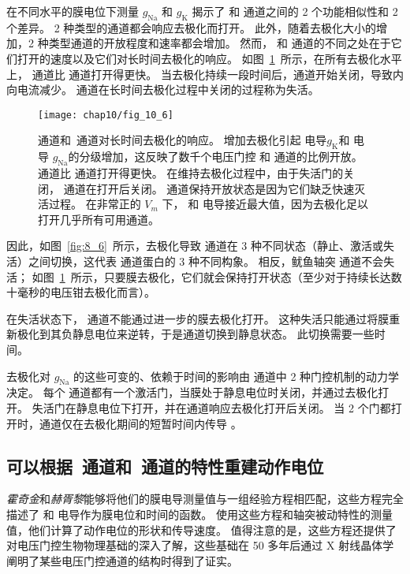 在不同水平的膜电位下测量 $g_\text{Na}$ 和 $g_\text{K}$ 揭示了  和  通道之间的 2 个功能相似性和 2 个差异。
2 种类型的通道都会响应去极化而打开。
此外，随着去极化大小的增加，2 种类型通道的开放程度和速率都会增加。
然而， 和  通道的不同之处在于它们打开的速度以及它们对长时间去极化的响应。
如图~\ref{fig:10_6}~所示，在所有去极化水平上， 通道比  通道打开得更快。 
当去极化持续一段时间后，通道开始关闭，导致内向电流减少。
 通道在长时间去极化过程中关闭的过程称为失活。


\begin{figure}[htbp]
	\centering
	\texttt{[image: chap10/fig\_10\_6]}
	\caption{通道和~通道对长时间去极化的响应。
		增加去极化引起  电导$g_\text{K}$和  电导 $g_\text{Na}$的分级增加，这反映了数千个电压门控  和  通道的比例开放。
		 通道比  通道打开得更快。
		在维持去极化过程中，由于失活门的关闭， 通道在打开后关闭。
		 通道保持开放状态是因为它们缺乏快速灭活过程。
		在非常正的 $V_m$ 下， 和  电导接近最大值，因为去极化足以打开几乎所有可用通道。}
	\label{fig:10_6}
\end{figure}


因此，如图~\ref{fig:8_6}~所示，去极化导致  通道在 3 种不同状态（静止、激活或失活）之间切换，这代表  通道蛋白的 3 种不同构象。
相反，鱿鱼轴突  通道不会失活；
如图~\ref{fig:10_6}~所示，只要膜去极化，它们就会保持打开状态（至少对于持续长达数十毫秒的电压钳去极化而言）。


在失活状态下， 通道不能通过进一步的膜去极化打开。
这种失活只能通过将膜重新极化到其负静息电位来逆转，于是通道切换到静息状态。
此切换需要一些时间。


去极化对 $g_\text{Na}$ 的这些可变的、依赖于时间的影响由  通道中 2 种门控机制的动力学决定。
每个  通道都有一个激活门，当膜处于静息电位时关闭，并通过去极化打开。
失活门在静息电位下打开，并在通道响应去极化打开后关闭。
当 2 个门都打开时，通道仅在去极化期间的短暂时间内传导 。



\subsection{可以根据~通道和~通道的特性重建动作电位}

\textit{霍奇金}和\textit{赫胥黎}能够将他们的膜电导测量值与一组经验方程相匹配，这些方程完全描述了  和  电导作为膜电位和时间的函数。
使用这些方程和轴突被动特性的测量值，他们计算了动作电位的形状和传导速度。
值得注意的是，这些方程还提供了对电压门控生物物理基础的深入了解，这些基础在 50 多年后通过 X 射线晶体学阐明了某些电压门控通道的结构时得到了证实。


